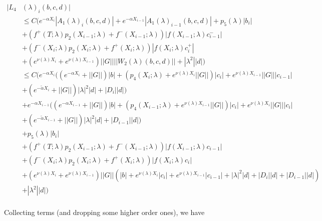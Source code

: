 \documentclass[12pt]{article}
\begin{document}
\begin{enumerate}
\begin{align*}
|L_4&(\lambda)_i(b, c, d)|\\ 
&\leq C \Big( e^{-\alpha X_i} |A_1(\lambda)_i(b, c, d)| +  e^{-\alpha X_{i-1}} |A_1(\lambda)_{i-1}(b, c, d)| + p_5(\lambda) |b_i| \\
&+ (f^+(T; \lambda) p_2(X_{i-1}; \lambda) + f^-(X_{i-1}; \lambda)) |f(X_{i-1}; \lambda) c_{i-1}^-| \\
&+ (f^-(X_i; \lambda) p_2(X_i; \lambda) + f^+(X_i; \lambda)) |f(X_i; \lambda) c_i^+| \\
&+ (e^{\nu(\lambda)X_i} + e^{\nu(\lambda)X_{i-1}}) ||G|| ||W_2(\lambda)(b,c,d)|| + |\lambda^2| |d| \Big) \\
&\leq C \Big( e^{-\alpha X_i} ( (e^{-\alpha X_i} + ||G||) |b| 
+ ( p_4(X_i; \lambda) + e^{\nu(\lambda)X_i} ||G||) |c_i| + e^{\nu(\lambda)X_{i-1}} ||G|| |c_{i-1}| \\
&+ (e^{-\tilde{\alpha} X_i} + ||G||) |\lambda|^2 |d| + |D_i||d| ) \\
&+ e^{-\alpha X_{i-1}} ( (e^{-\alpha X_{i-1}} + ||G||) |b| 
+ ( p_4(X_{i-1}; \lambda) + e^{\nu(\lambda)X_{i-1}} ||G||) |c_i| + e^{\nu(\lambda)X_i} ||G|| |c_i| \\
&+ (e^{-\tilde{\alpha} X_{i-1}} + ||G||) |\lambda|^2 |d| + |D_{i-1}||d| ) \\
&+ p_5(\lambda) |b_i| \\
&+ (f^+(T; \lambda) p_2(X_{i-1}; \lambda) + f^-(X_{i-1}; \lambda)) |f(X_{i-1}; \lambda) c_{i-1}| \\
&+ (f^-(X_i; \lambda) p_2(X_i; \lambda) + f^+(X_i; \lambda)) |f(X_i; \lambda) c_i| \\
&+ (e^{\nu(\lambda)X_i} + e^{\nu(\lambda)X_{i-1}}) ||G|| ( |b| + e^{\nu(\lambda)X_i} |c_i| + e^{\nu(\lambda)X_{i-1}} |c_{i-1}| 
+ |\lambda|^2 |d| + |D_i||d| + |D_{i-1}||d|)\\ 
&+ |\lambda^2| |d| \Big) \\
\end{align*}

Collecting terms (and dropping some higher order ones), we have


\end{enumerate}
\end{document}
